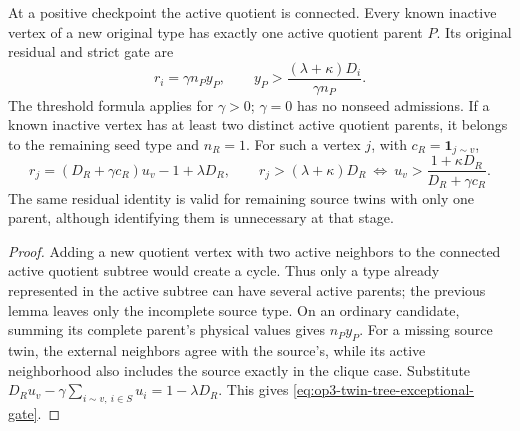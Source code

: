 \begin{lemma}
\label{lem:op3-twin-tree-gates}
At a positive checkpoint the active quotient is connected. Every known
inactive vertex of a new original type has exactly one active quotient
parent $P$. Its original residual and strict gate are
\[
 r_i=\gamma n_Py_P,\qquad
 y_P>\frac{(\lambda+\kappa)D_i}{\gamma n_P}.
\]
The threshold formula applies for $\gamma>0$; $\gamma=0$ has no nonseed
admissions. If a known inactive vertex has at least two distinct active
quotient parents, it belongs to the remaining seed type and $n_R=1$.
For such a vertex $j$, with $c_R=\boldsymbol1_{j\sim v}$,
\begin{equation}
 r_j=(D_R+\gamma c_R)u_v-1+\lambda D_R,\qquad
 r_j>(\lambda+\kappa)D_R
 \ \Longleftrightarrow\ 
 u_v>\frac{1+\kappa D_R}{D_R+\gamma c_R}.
 \label{eq:op3-twin-tree-exceptional-gate}
\end{equation}
The same residual identity is valid for remaining source twins with only
one parent, although identifying them is unnecessary at that stage.
\end{lemma}
\begin{proof}
Adding a new quotient vertex with two active neighbors to the connected
active quotient subtree would create a cycle. Thus only a type already
represented in the active subtree can have several active parents; the
previous lemma leaves only the incomplete source type. On an ordinary
candidate, summing its complete parent's physical values gives $n_Py_P$.
For a missing source twin, the external neighbors agree with the source's,
while its active neighborhood also includes the source exactly in the
clique case. Substitute
$D_Ru_v-\gamma\sum_{i\sim v,\ i\in S}u_i=1-\lambda D_R$.
This gives \eqref{eq:op3-twin-tree-exceptional-gate}.
\end{proof}

